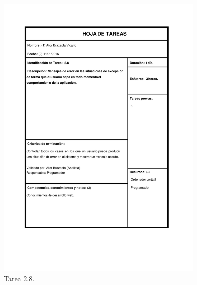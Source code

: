 \documentclass{DeustoFDP}
\begin{document}
\begin{figure}[H]
	\centering
	\includegraphics[width=0.9\textwidth]{fig/Tareas/28}
	\caption{Tarea 2.8.}
	\label{fig:t28}
\end{figure}
\end{document}
